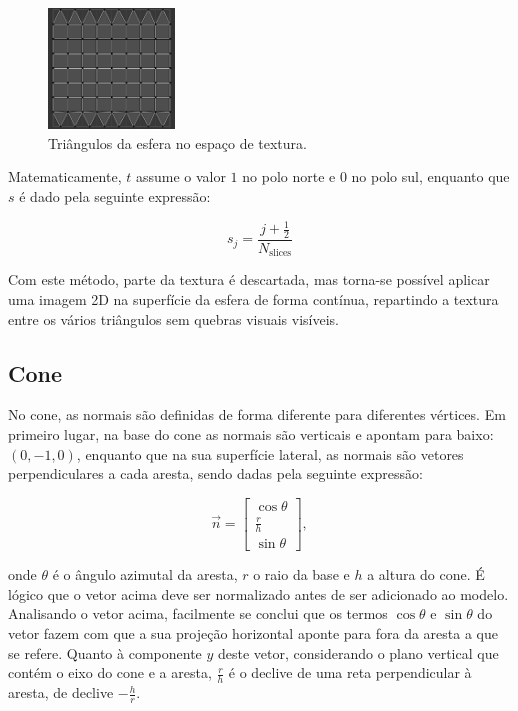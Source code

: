 \documentclass[12pt, a4paper]{article}
\begin{document}
\begin{figure}[H]
    \centering
    \includegraphics[width=0.3\textwidth]{res/phase4/SphereUV.png}
    \caption{Triângulos da esfera no espaço de textura.}
\end{figure}

Matematicamente, $t$ assume o valor $1$ no polo norte e $0$ no polo sul, enquanto que $s$ é dado
pela seguinte expressão:

$$
s_j = \frac{j + \frac{1}{2}}{N_\text{slices}}
$$

Com este método, parte da textura é descartada, mas torna-se possível aplicar uma imagem 2D na
superfície da esfera de forma contínua, repartindo a textura entre os vários triângulos sem quebras
visuais visíveis.

\subsection{Cone}

No cone, as normais são definidas de forma diferente para diferentes vértices. Em primeiro lugar, na
base do cone as normais são verticais e apontam para baixo: $(0, -1, 0)$, enquanto que na sua
superfície lateral, as normais são vetores perpendiculares a cada aresta, sendo dadas pela seguinte
expressão:

$$
\vec{n} =
\begin{bmatrix}
    \cos \theta \\
    \frac{r}{h} \\
    \sin \theta
\end{bmatrix},
$$

onde $\theta$ é o ângulo azimutal da aresta, $r$ o raio da base e $h$ a altura do cone. É lógico que
o vetor acima deve ser normalizado antes de ser adicionado ao modelo. Analisando o vetor acima,
facilmente se conclui que os termos $\cos \theta$ e $\sin \theta$ do vetor fazem com que a sua
projeção horizontal aponte para fora da aresta a que se refere. Quanto à componente $y$ deste
vetor, considerando o plano vertical que contém o eixo do cone e a aresta, $\frac{r}{h}$ é o declive
de uma reta perpendicular à aresta, de declive $-\frac{h}{r}$.
\end{document}
